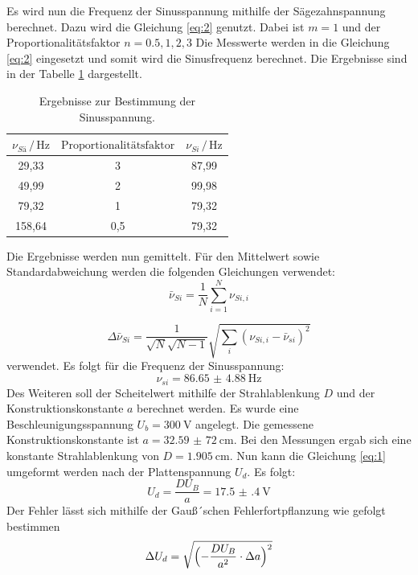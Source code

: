 Es wird nun die Frequenz der Sinusspannung mithilfe der Sägezahnspannung
berechnet.
Dazu wird die Gleichung \ref{eq:2} genutzt. Dabei ist $m = 1$ und der
Proportionalitätsfaktor $n= 0.5, 1, 2, 3$
Die Messwerte werden in die Gleichung \ref{eq:2} eingesetzt und somit wird die Sinusfrequenz berechnet.
Die Ergebnisse sind in der Tabelle \ref{tab:3} dargestellt.
\begin{table}[H]
  \centering
  \caption{Ergebnisse zur Bestimmung der Sinusspannung.}
  \label{tab:3}
  \begin{tabular}{c c c}
\toprule
$\nu_{Sä} \,/\, \si{\hertz}$& $\text{Proportionalitätsfaktor}$ & $\nu_{Si} \, /\, \si{\hertz}$\\
\midrule
29,33 & 3 & 87,99\\
49,99 & 2 & 99,98\\
79,32 & 1 & 79,32\\
158,64& 0,5& 79,32\\
\bottomrule
  \end{tabular}
\end{table}
Die Ergebnisse werden nun gemittelt.
Für den Mittelwert sowie Standardabweichung werden die folgenden Gleichungen verwendet:
\begin{equation*}
    \bar{\nu}_{Si}= \frac{1}{N} \sum_{i=1}^{N} \nu_{Si,i}
\end{equation*}

\begin{equation*}
  \Delta \bar{\nu}_{Si} = \frac{1}{\sqrt{N}\sqrt{N-1}} \sqrt{\sum_{i}(\nu_{Si,i}-\bar{\nu}_{si})^2}
\end{equation*}
verwendet.
Es folgt für die Frequenz der Sinusspannung:
\begin{equation*}
  \nu_{si}= \SI{86.65(488)}{\hertz}
\end{equation*}
Des Weiteren soll der Scheitelwert mithilfe der Strahlablenkung $D$ und der Konstruktionskonstante $a$ berechnet werden.
Es wurde eine Beschleunigungsspannung $U_b = \SI{300}{\volt}$ angelegt. Die gemessene Konstruktionskonstante ist
$a = \SI{32,59(72)}{\centi\meter}$.
Bei den Messungen ergab sich eine konstante Strahlablenkung von $D = \SI{1.905}{\centi\meter}$.
Nun kann die Gleichung \ref{eq:1} umgeformt werden nach  der Plattenspannung $U_d$.
Es folgt:
\begin{equation*}
  U_d = \frac{D U_B}{a} = \SI{17.5(4)}{\volt}
\end{equation*}
Der Fehler lässt sich mithilfe der Gauß´schen Fehlerfortpflanzung wie gefolgt bestimmen
\begin{equation}
  \Delta U_d = \sqrt{\Bigl(-\frac{DU_B}{a^2}\cdot \Delta a\Bigr)^2}
\end{equation}
